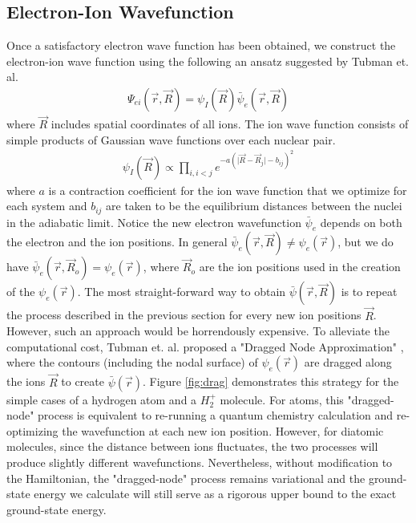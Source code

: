 \documentclass[aps,prl,superscriptaddress,groupedaddress]{revtex4}
\begin{document}
\subsection{Electron-Ion Wavefunction}
Once a satisfactory electron wave function has been obtained, we construct the electron-ion wave function using the following an ansatz suggested by Tubman et. al.\cite{Tubman_ECG}
\begin{align}
\Psi_{ei}(\vec{r},\vec{R})=\psi_I(\vec{R})\bar{\psi}_e(\vec{r},\vec{R}) \label{eq:psi}
\end{align}
where $\vec{R}$ includes spatial coordinates of all ions. The ion wave function consists of simple products of Gaussian wave functions over each nuclear pair.
\begin{align}
\psi_I(\vec{R})\propto \prod\limits_{i,i<j}e^{-a(\vert \vec{R}-\vec{R}_j\vert-b_{ij})^2}
\end{align}
where $a$ is a contraction coefficient for the ion wave function that we optimize for each system and $b_{ij}$ are taken to be the equilibrium distances between the nuclei in the adiabatic limit. Notice the new electron wavefunction $\bar{\psi}_e$ depends on both the electron and the ion positions. In general $\bar{\psi}_e(\vec{r},\vec{R})\neq\psi_e(\vec{r})$, but we do have $\bar{\psi}_e(\vec{r},\vec{R}_o)=\psi_e(\vec{r})$, where $\vec{R}_o$ are the ion positions used in the creation of the $\psi_e(\vec{r})$. The most straight-forward way to obtain $\bar{\psi}(\vec{r},\vec{R})$ is to repeat the process described in the previous section for every new ion positions $\vec{R}$. However, such an approach would be horrendously expensive. To alleviate the computational cost, Tubman et. al. proposed a "Dragged Node Approximation" \cite{Tubman_ECG}, where the contours (including the nodal surface) of $\psi_e(\vec{r})$ are dragged along the ions $\vec{R}$ to create $\bar{\psi}(\vec{r})$. Figure \ref{fig:drag} demonstrates this strategy for the simple cases of a hydrogen atom and a $H_2^+$ molecule. For atoms, this "dragged-node" process is equivalent to re-running a quantum chemistry calculation and re-optimizing the wavefunction at each new ion position. However, for diatomic molecules, since the distance between ions fluctuates, the two processes will produce slightly different wavefunctions. Nevertheless, without modification to the Hamiltonian, the "dragged-node" process remains variational and the ground-state energy we calculate will still serve as a rigorous upper bound to the exact ground-state energy.
\end{document}
